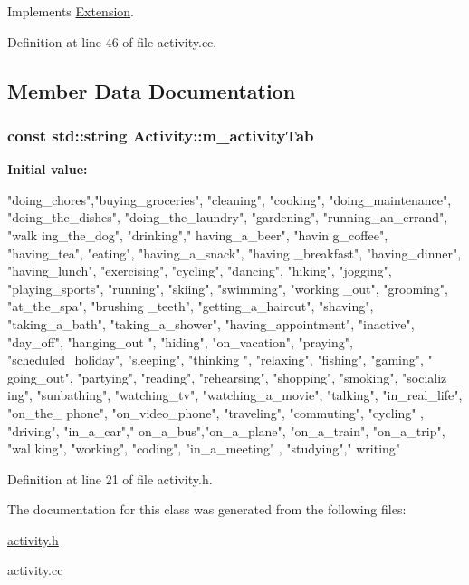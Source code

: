 Implements \hyperlink{classExtension_a934ee9dd373d61a41ea98f919e9abcbd}{Extension}.



Definition at line 46 of file activity.cc.



\subsection{Member Data Documentation}
\hypertarget{classActivity_abe196e495d5f4f0f1876b8908bc53081}{
\subsubsection[{m\_\-activityTab}]{\setlength{\rightskip}{0pt plus 5cm}const std::string Activity::m\_\-activityTab}}
\label{classActivity_abe196e495d5f4f0f1876b8908bc53081}
{\bfseries Initial value:}
\begin{DoxyCode}
 {{"doing_chores","buying_groceries", "cleaning", "cooking", "doing_maintenance",
       "doing_the_dishes", "doing_the_laundry", "gardening", "running_an_errand", "walk
      ing_the_dog"},
                                             {"drinking"," having_a_beer", "havin
      g_coffee", "having_tea"},
                                             {"eating", "having_a_snack", "having
      _breakfast", "having_dinner", "having_lunch"},
                                             {"exercising", "cycling", "dancing",
       "hiking", "jogging", "playing_sports", "running", "skiing", "swimming", "working
      _out"},
                                             {"grooming", "at_the_spa", "brushing
      _teeth", "getting_a_haircut", "shaving", "taking_a_bath", "taking_a_shower"},
                                             {"having_appointment"}, 
                                             {"inactive", "day_off", "hanging_out
      ", "hiding", "on_vacation", "praying", "scheduled_holiday", "sleeping", "thinking
      "},
                                             {"relaxing",  "fishing", "gaming", "
      going_out", "partying", "reading", "rehearsing", "shopping", "smoking", "socializ
      ing", "sunbathing", "watching_tv", "watching_a_movie"},
                                             {"talking", "in_real_life", "on_the_
      phone", "on_video_phone"},
                                             {"traveling", "commuting", "cycling"
      , "driving", "in_a_car"," on_a_bus","on_a_plane", "on_a_train", "on_a_trip", "wal
      king"},
                                             {"working", "coding", "in_a_meeting"
      , "studying"," writing"}
 }
\end{DoxyCode}


Definition at line 21 of file activity.h.



The documentation for this class was generated from the following files:\begin{DoxyCompactItemize}
\item 
\hyperlink{activity_8h}{activity.h}\item 
activity.cc\end{DoxyCompactItemize}
